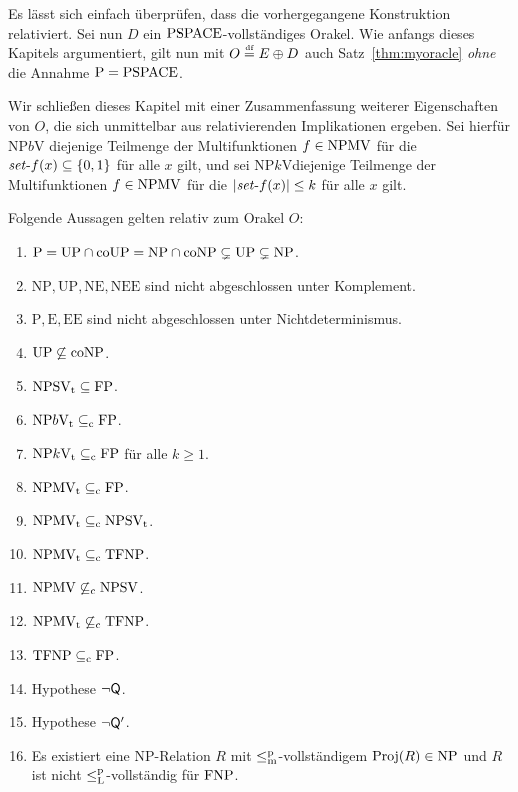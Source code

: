Es lässt sich einfach überprüfen, dass die vorhergegangene Konstruktion relativiert.
Sei nun $D$ ein $\mathrm{PSPACE}$-vollständiges Orakel.
Wie anfangs dieses Kapitels argumentiert, gilt nun mit $O\stackrel{\text{\smash{\tiny df}}}{=} E\oplus D$ auch Satz~\ref{thm:myoracle} \emph{ohne} die Annahme $\mathrm{P}=\mathrm{PSPACE}$.

Wir schließen dieses Kapitel mit einer Zusammenfassung weiterer Eigenschaften von $O$, die sich unmittelbar aus relativierenden Implikationen ergeben.
Sei hierfür $\mathrm{NP}b\mathrm{V}$ diejenige Teilmenge der Multifunktionen $f\in\mathrm{NPMV}$ für die $\mathit{set}\text{-}{f}(x)\subseteq\{0,1\}$ für alle $x$ gilt, 
und sei $\mathrm{NP}k\mathrm{V}$diejenige Teilmenge der Multifunktionen $f\in\mathrm{NPMV}$ für die $|\mathit{set}\text{-}{f}(x)|\leq k$ für alle $x$ gilt.
\begin{corollary}
    Folgende Aussagen gelten relativ zum Orakel $O$:
    \begin{enumerate}[noitemsep,midpenalty=0]\raggedright
        \item $\mathrm{P}=\mathrm{UP}\cap\mathrm{coUP}=\mathrm{NP}\cap\mathrm{coNP}\subsetneq \mathrm{UP} \subsetneq \mathrm{NP}$.
        \item $\mathrm{NP, UP, NE, NEE}$ sind nicht abgeschlossen unter Komplement. 
        \item $\mathrm{P, E, EE}$ sind nicht abgeschlossen unter Nichtdeterminismus.
        \item $\mathrm{UP}\not\subseteq \mathrm{coNP}$.
        \item $\mathrm{NPSV_t}\subseteq\mathrm{FP}$.
        \item $\mathrm{NP}b\mathrm{V_t} \subseteq_{\mathrm{c}}\mathrm{FP}$.
        \item $\mathrm{NP}k\mathrm{V_t} \subseteq_{\mathrm{c}}\mathrm{FP}$ für alle $k\geq 1$.
        \item $\mathrm{NPMV_t} \subseteq_{\mathrm{c}} \mathrm{FP}$.
        \item $\mathrm{NPMV_t} \subseteq_{\mathrm{c}} \mathrm{NPSV_t}$.
        \item $\mathrm{NPMV_t} \subseteq_{\mathrm{c}} \mathrm{TFNP}$.
        \item $\mathrm{NPMV} \not\subseteq_{\mathrm{c}} \mathrm{NPSV}$.
        \item $\mathrm{NPMV_t} \not\subseteq_{\mathrm{c}} \mathrm{TFNP}$.
        \item $\mathrm{TFNP}\subseteq_{\mathrm{c}} \mathrm{FP}$.
        \item Hypothese $\neg\mathsf{Q}$.
        \item Hypothese $\neg\mathsf{Q}'$.
        \item Es existiert eine NP-Relation $R$ mit $\leq_\mathrm{m}^\mathrm{p}$-vollständigem $\operatorname{Proj}(R)\in\mathrm{NP}$ und $R$ ist nicht $\leq_\mathrm{L}^\mathrm{p}$-vollständig für $\mathrm{FNP}$.

\end{enumerate}
\end{corollary}
